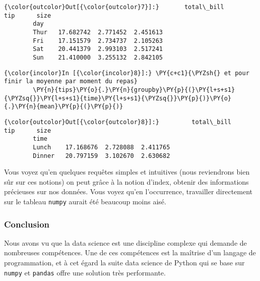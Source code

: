 \begin{Verbatim}[commandchars=\\\{\},frame=single,framerule=0.3mm,rulecolor=\color{cellframecolor}]
{\color{outcolor}Out[{\color{outcolor}7}]:}       total\_bill       tip      size
        day                                 
        Thur   17.682742  2.771452  2.451613
        Fri    17.151579  2.734737  2.105263
        Sat    20.441379  2.993103  2.517241
        Sun    21.410000  3.255132  2.842105
\end{Verbatim}
            
    \begin{Verbatim}[commandchars=\\\{\},frame=single,framerule=0.3mm,rulecolor=\color{cellframecolor}]
{\color{incolor}In [{\color{incolor}8}]:} \PY{c+c1}{\PYZsh{} et pour finir la moyenne par moment du repas}
        \PY{n}{tips}\PY{o}{.}\PY{n}{groupby}\PY{p}{(}\PY{l+s+s1}{\PYZsq{}}\PY{l+s+s1}{time}\PY{l+s+s1}{\PYZsq{}}\PY{p}{)}\PY{o}{.}\PY{n}{mean}\PY{p}{(}\PY{p}{)}
\end{Verbatim}


\begin{Verbatim}[commandchars=\\\{\},frame=single,framerule=0.3mm,rulecolor=\color{cellframecolor}]
{\color{outcolor}Out[{\color{outcolor}8}]:}         total\_bill       tip      size
        time                                  
        Lunch    17.168676  2.728088  2.411765
        Dinner   20.797159  3.102670  2.630682
\end{Verbatim}
            
    Vous voyez qu'en quelques requêtes simples et intuitives (nous
reviendrons bien sûr sur ces notions) on peut grâce à la notion d'index,
obtenir des informations précieuses sur nos données. Vous voyez qu'en
l'occurrence, travailler directement sur le tableau \texttt{numpy}
aurait été beaucoup moins aisé.

    \hypertarget{conclusion}{%
\subsubsection{Conclusion}\label{conclusion}}

    Nous avons vu que la data science est une discipline complexe qui
demande de nombreuses compétences. Une de ces compétences est la
maîtrise d'un langage de programmation, et à cet égard la suite data
science de Python qui se base sur \texttt{numpy} et \texttt{pandas}
offre une solution très performante.

